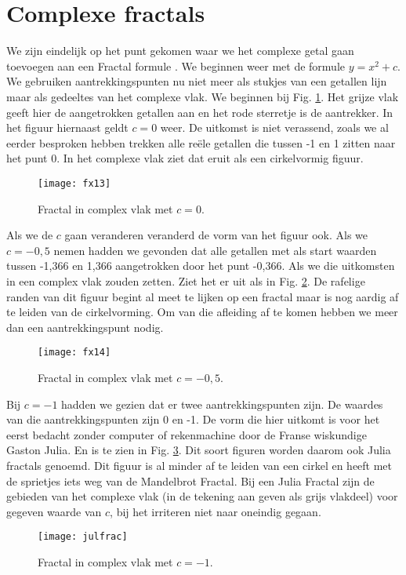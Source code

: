\documentclass[11pt,fleqn]{book} %
\begin{document}
\section{Complexe fractals}
We zijn eindelijk op het punt gekomen waar we het complexe getal gaan toevoegen aan een Fractal formule \cite{fraccomplexegetallen}. We beginnen weer met de formule $y=x^2+c$. We gebruiken aantrekkingspunten nu niet meer als stukjes van een getallen lijn maar als gedeeltes van het complexe vlak. We beginnen bij Fig. \ref{fig:fx13}. Het grijze vlak geeft hier de aangetrokken getallen aan en het rode sterretje is de aantrekker. In het figuur hiernaast geldt $c=0$ weer. De uitkomst is niet verassend, zoals we al eerder besproken hebben trekken alle reële getallen die tussen -1 en 1 zitten naar het punt 0. In het complexe vlak ziet dat eruit als een cirkelvormig figuur.
\begin{figure}[h]
	\centering\texttt{[image: fx13]}
	\caption{Fractal in complex vlak met $c=0$.}
	\label{fig:fx13}
\end{figure}
Als we de $c$ gaan veranderen veranderd de vorm van het figuur ook. Als we $c=-0,5$ nemen hadden we gevonden dat alle getallen met als start waarden tussen -1,366 en 1,366 aangetrokken door het punt -0,366. Als we die uitkomsten in een complex vlak zouden zetten. Ziet het er uit als in Fig. \ref{fig:fx14}. De rafelige randen van dit figuur begint al meet te lijken op een fractal maar is nog aardig af te leiden van de cirkelvorming.
Om van die afleiding af te komen hebben we meer dan een aantrekkingspunt nodig. 
\begin{figure}[h]
	\centering\texttt{[image: fx14]}
	\caption{Fractal in complex vlak met $c=-0,5$.}
	\label{fig:fx14}
\end{figure}
Bij $c=-1$ hadden we gezien dat er twee aantrekkingspunten zijn. De waardes van die aantrekkingspunten zijn 0 en -1. De vorm die hier uitkomt is voor het eerst bedacht zonder computer of rekenmachine door de Franse wiskundige Gaston Julia. En is te zien in Fig. \ref{fig:julfrac}. Dit soort figuren worden daarom ook Julia fractals genoemd. Dit figuur is al minder af te leiden van een cirkel en heeft met de sprietjes iets weg van de Mandelbrot Fractal.
Bij een Julia Fractal zijn de gebieden van het complexe vlak (in de tekening aan geven als grijs vlakdeel) voor gegeven waarde van $c$, bij het irriteren niet naar oneindig gegaan.
\begin{figure}[h]
	\centering\texttt{[image: julfrac]}
	\caption{Fractal in complex vlak met $c=-1$.}
	\label{fig:julfrac}
\end{figure}
\end{document}

